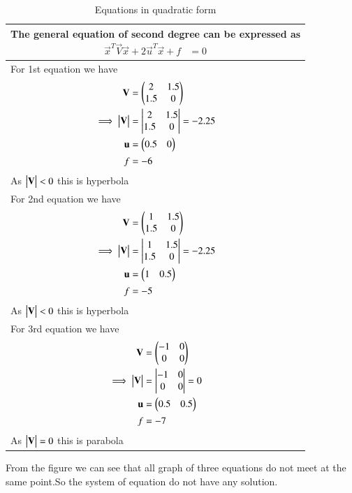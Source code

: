 \documentclass[journal,12pt,twocolumn]{IEEEtran}
\begin{document}
\begin{table}[h!]
\begin{center}
\begin{tabular}{|m{9cm}|}\hline
        The general equation of second degree can be expressed as
        {\begin{align*}
            \vec{x}^T\vec{V}\vec{x}+2\vec{u}^T\vec{x}+f &= 0
        \end{align*}}\\
        \hline
        For 1st equation we have{\begin{align*}
            \mathbf{V} &= \begin{pmatrix}2&1.5\\1.5&0\end{pmatrix}\\
            \implies\begin{vmatrix}\mathbf{V}\end{vmatrix} &= \begin{vmatrix}2&1.5\\1.5&0\end{vmatrix}=-2.25\\
            \mathbf{u} &= \begin{pmatrix}0.5&0\end{pmatrix}\\
            f &= -6
        \end{align*}}
        As $\begin{vmatrix}\mathbf{V}\end{vmatrix}<0$ this is hyperbola\\
        \hline
        For 2nd equation we have{\begin{align*}
            \mathbf{V} &= \begin{pmatrix}1&1.5\\1.5&0\end{pmatrix}\\
            \implies\begin{vmatrix}\mathbf{V}\end{vmatrix} &= \begin{vmatrix}1&1.5\\1.5&0\end{vmatrix}=-2.25\\
            \mathbf{u} &= \begin{pmatrix}1&0.5\end{pmatrix}\\
            f &= -5
        \end{align*}}
        As $\begin{vmatrix}\mathbf{V}\end{vmatrix}<0$ this is hyperbola\\
        \hline
        For 3rd equation we have{\begin{align*}
            \mathbf{V} &= \begin{pmatrix}-1&0\\0&0\end{pmatrix}\\
            \implies\begin{vmatrix}\mathbf{V}\end{vmatrix} &= \begin{vmatrix}-1&0\\0&0\end{vmatrix} = 0\\
            \mathbf{u} &= \begin{pmatrix}0.5&0.5\end{pmatrix}\\
            f &= -7
        \end{align*}}
        As $\begin{vmatrix}\mathbf{V}\end{vmatrix}=0$ this is parabola\\
        \hline
\end{tabular}
\end{center}
\caption{Equations in quadratic form}
\label{tab:my_label}
\end{table}
From the figure we can see that all graph of three equations do not meet at the same point.So the system of equation do not have any solution. 
\end{document}
